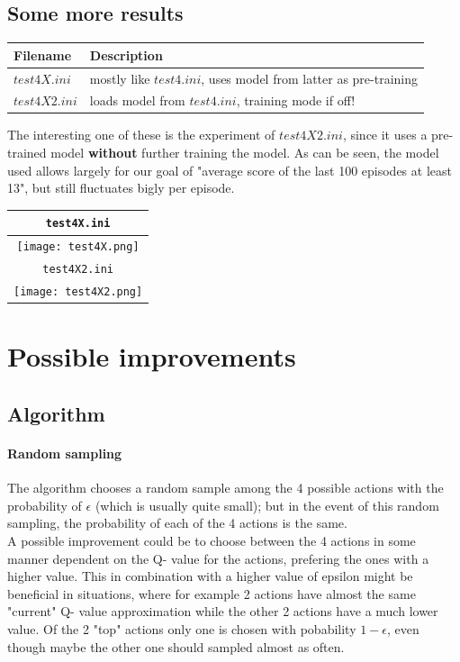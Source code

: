 \documentclass{article}
\begin{document}
\subsection{Some more results}

\begin{tabular}{ |l|l| }
  \hline
Filename & Description \\
  \hline
$test4X.ini$ & \makecell[tl]{mostly like $test4.ini$, uses model \\ from latter as pre-training} \\
$test4X2.ini$ & \makecell[tl]{loads model from $test4.ini$, \\ training mode if off!} \\
  \hline
\end{tabular}

The interesting one of these is the experiment of $test4X2.ini$, since it uses
a pre-trained model \textbf{without} further training the model. As can be seen,
the model used allows largely for our goal of "average score of the last 100
episodes at least 13", but still fluctuates bigly per episode.

\begin{tabular}{ |c| }
  \hline
  \texttt{test4X.ini}  \\
  \hline
  \texttt{[image: test4X.png]} \\
  \hline
  \texttt{test4X2.ini}  \\
  \hline
  \texttt{[image: test4X2.png]} \\
  \hline
\end{tabular}

\section{Possible improvements}
\subsection{Algorithm}
\paragraph{Random sampling}
The algorithm chooses a random sample among the 4 possible actions with
the probability of $\epsilon$ (which is usually quite small); but in the event
of this random sampling, the probability of each of the 4 actions is the same.
\\
A possible improvement could be to choose between the 4 actions in some manner
dependent on the Q- value for the actions, prefering the ones with a higher value.
This in combination with a higher value of epsilon might be beneficial in situations,
where for example 2 actions have almost the same "current" Q- value approximation
while the other 2 actions have a much lower value. Of the 2 "top" actions only
one is chosen with pobability $1 - \epsilon$, even though maybe the other one should
sampled almost as often.
\end{document}
